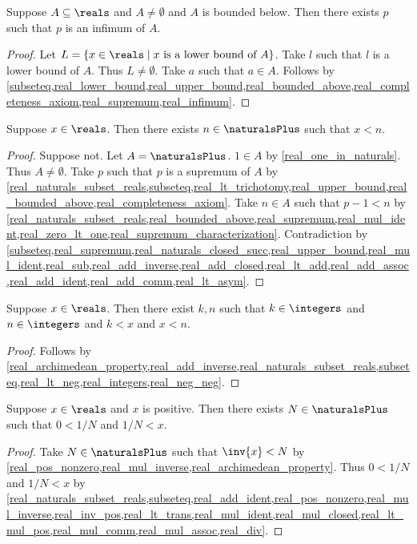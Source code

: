 \begin{proposition}\label{real_infimum_exists}
    Suppose $A\subseteq\reals$ and $A\neq \emptyset$ and $A$ is bounded below.
    Then there exists $p$ such that $p$ is an infimum of $A$.
\end{proposition}
\begin{proof}
    Let $L = \{ x\in\reals \mid \text{$x$ is a lower bound of $A$}\}$.
    Take $l$ such that $l$ is a lower bound of $A$.
    Thus $L\neq \emptyset$.
    Take $a$ such that $a\in A$.
    Follows by \cref{subseteq,real_lower_bound,real_upper_bound,real_bounded_above,real_completeness_axiom,real_supremum,real_infimum}.
\end{proof}

\begin{proposition}\label{real_archimedean_property}
    Suppose $x\in\reals$.
    Then there exists $n\in\naturalsPlus$ such that $x < n$.
\end{proposition}
\begin{proof}
    Suppose not.
    Let $A = \naturalsPlus$.
    $1\in A$ by \cref{real_one_in_naturals}.
    Thus $A\neq \emptyset$.
    Take $p$ such that $p$ is a supremum of $A$ by \cref{real_naturals_subset_reals,subseteq,real_lt_trichotomy,real_upper_bound,real_bounded_above,real_completeness_axiom}.
    Take $n\in A$ such that $p - 1 < n$ by \cref{real_naturals_subset_reals,real_bounded_above,real_supremum,real_mul_ident,real_zero_lt_one,real_supremum_characterization}.
    Contradiction by \cref{subseteq,real_supremum,real_naturals_closed_succ,real_upper_bound,real_mul_ident,real_sub,real_add_inverse,real_add_closed,real_lt_add,real_add_assoc,real_add_ident,real_add_comm,real_lt_asym}.
\end{proof}

\begin{proposition}\label{real_generalized_archimedean_property}
    Suppose $x\in\reals$.
    Then there exist $k, n$ such that $k\in\integers$ and $n\in\integers$ and $k < x$ and $x < n$.
\end{proposition}
\begin{proof}
    Follows by \cref{real_archimedean_property,real_add_inverse,real_naturals_subset_reals,subseteq,real_lt_neg,real_integers,real_neg_neg}.
\end{proof}

\begin{proposition}\label{real_small_reciprocal}
    Suppose $x\in\reals$ and $x$ is positive.
    Then there exists $N\in\naturalsPlus$ such that $0 < 1 / N$ and $1 / N < x$.
\end{proposition}
\begin{proof}
    Take $N\in\naturalsPlus$ such that $\inv{x} < N$ by \cref{real_pos_nonzero,real_mul_inverse,real_archimedean_property}. Thus $0 < 1 / N$ and $1 / N < x$ by \cref{real_naturals_subset_reals,subseteq,real_add_ident,real_pos_nonzero,real_mul_inverse,real_inv_pos,real_lt_trans,real_mul_ident,real_mul_closed,real_lt_mul_pos,real_mul_comm,real_mul_assoc,real_div}.
\end{proof}

